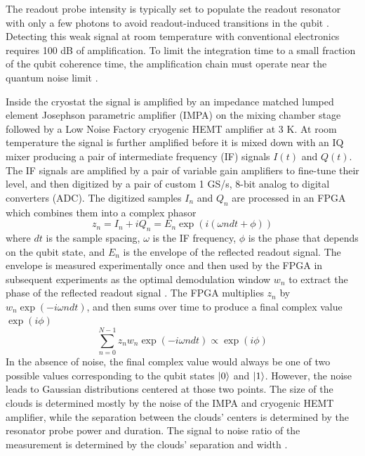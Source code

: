 The readout probe intensity is typically set to populate the readout resonator with only a few photons to avoid readout-induced transitions in the qubit \cite{Sank2016Transitions}.
Detecting this weak signal at room temperature with conventional electronics requires 100 dB of amplification.
To limit the integration time to a small fraction of the qubit coherence time, the amplification chain must operate near the quantum noise limit \cite{clerk2010intro, caves1982Amplifiers}.

Inside the cryostat the signal is amplified by an impedance matched lumped element Josephson parametric amplifier (IMPA) \cite{Mutus2014IMPA} on the mixing chamber stage followed by a Low Noise Factory cryogenic HEMT amplifier at 3 K.
At room temperature the signal is further amplified before it is mixed down with an IQ mixer producing a pair of intermediate frequency (IF) signals $I(t)$ and $Q(t)$.
The IF signals are amplified by a pair of variable gain amplifiers to fine-tune their level, and then digitized by a pair of custom 1 GS/s, 8-bit analog to digital converters (ADC).
The digitized samples $I_n$ and $Q_n$  are processed in an FPGA which combines them into a complex phasor
\begin{equation*}
  z_n = I_n + iQ_n = E_n \exp(i (\omega n dt + \phi))
\end{equation*}
where $dt$ is the sample spacing, $\omega$ is the IF frequency, $\phi$ is the phase that depends on the qubit state, and $E_n$ is the envelope of the reflected readout signal.
The envelope is measured experimentally once and then used by the FPGA in subsequent experiments as the optimal demodulation window $w_n$ to extract the phase of the reflected readout signal \cite{ryan2015tomography, Jeffrey2014Fast}.
The FPGA multiplies $z_n$ by $w_n \exp(-i \omega n dt)$, and then sums over time to produce a final complex value $\exp(i \phi)$
\begin{equation*}
  \sum_{n=0}^{N-1} z_n w_n \exp(-i \omega n dt) \propto \exp(i \phi)
\end{equation*}
In the absence of noise, the final complex value would always be one of two possible values corresponding to the qubit states $\mathinner{|{0}\rangle}$ and $\mathinner{|{1}\rangle}$.
However, the noise leads to Gaussian distributions centered at those two points.
The size of the clouds is determined mostly by the noise of the IMPA and cryogenic HEMT amplifier, while the separation between the clouds' centers is determined by the resonator probe power and duration.
The signal to noise ratio of the measurement is determined by the clouds' separation and width \cite{Jeffrey2014Fast, Sank2015Noise}.

